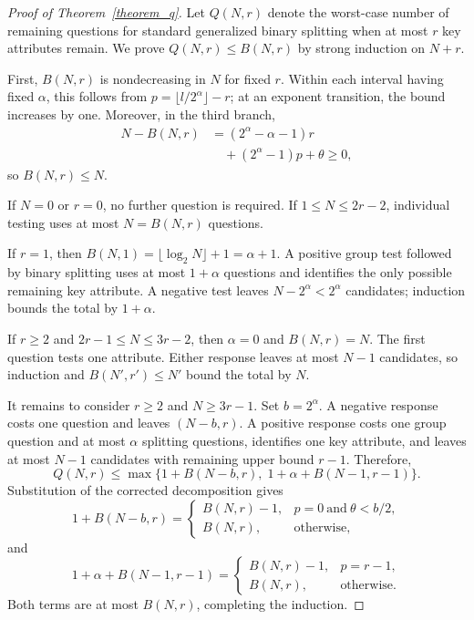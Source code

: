 \begin{proof}[Proof of Theorem~\ref{theorem_q}]
Let $Q(N,r)$ denote the worst-case number of remaining questions for standard generalized binary splitting when at most $r$ key attributes remain. We prove $Q(N,r)\leq B(N,r)$ by strong induction on $N+r$.

First, $B(N,r)$ is nondecreasing in $N$ for fixed $r$. Within each interval having fixed $\alpha$, this follows from $p=\lfloor l/2^\alpha\rfloor-r$; at an exponent transition, the bound increases by one. Moreover, in the third branch,
\[
\begin{aligned}
N-B(N,r)&=(2^\alpha-\alpha-1)r\\
&\quad +(2^\alpha-1)p+\theta\geq0,
\end{aligned}
\]
so $B(N,r)\leq N$.

If $N=0$ or $r=0$, no further question is required. If $1\leq N\leq2r-2$, individual testing uses at most $N=B(N,r)$ questions.

If $r=1$, then $B(N,1)=\lfloor\log_2N\rfloor+1=\alpha+1$. A positive group test followed by binary splitting uses at most $1+\alpha$ questions and identifies the only possible remaining key attribute. A negative test leaves $N-2^\alpha<2^\alpha$ candidates; induction bounds the total by $1+\alpha$.

If $r\geq2$ and $2r-1\leq N\leq3r-2$, then $\alpha=0$ and $B(N,r)=N$. The first question tests one attribute. Either response leaves at most $N-1$ candidates, so induction and $B(N',r')\leq N'$ bound the total by $N$.

It remains to consider $r\geq2$ and $N\geq3r-1$. Set $b=2^\alpha$. A negative response costs one question and leaves $(N-b,r)$. A positive response costs one group question and at most $\alpha$ splitting questions, identifies one key attribute, and leaves at most $N-1$ candidates with remaining upper bound $r-1$. Therefore,
\[
Q(N,r)\leq\max\{1+B(N-b,r),\;1+\alpha+B(N-1,r-1)\}.
\]
Substitution of the corrected decomposition gives
\[
1+B(N-b,r)=
\begin{cases}
B(N,r)-1,&p=0\ \text{and}\ \theta<b/2,\\
B(N,r),&\text{otherwise},
\end{cases}
\]
and
\[
1+\alpha+B(N-1,r-1)=
\begin{cases}
B(N,r)-1,&p=r-1,\\
B(N,r),&\text{otherwise}.
\end{cases}
\]
Both terms are at most $B(N,r)$, completing the induction.
\end{proof}

